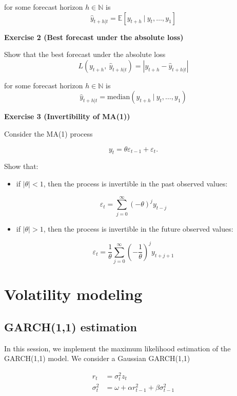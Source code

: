 \documentclass[
]{book}
\providecommand{\tightlist}{%
  \setlength{\itemsep}{0pt}\setlength{\parskip}{0pt}}
\begin{document}
for some forecast horizon \(h \in \mathbb{N}\) is
\[
\hat{y}_{t+h|t} = \mathbb{E} [y_{t+h} \ | \ y_t, \dots, y_1]
\]

\textbf{Exercise 2 (Best forecast under the absolute loss)}

Show that the best forecast under the absolute loss
\[
L(y_{t+h}, \ \hat{y}_{t+h|t}) = |y_{t+h}-\hat{y}_{t+h|t}|
\]

for some forecast horizon \(h \in \mathbb{N}\) is
\[
\hat{y}_{t+h|t} = \text{median}(y_{t+h}  \ | \ y_t, \dots, y_1)
\]

\textbf{Exercise 3 (Invertibility of MA(1))}

Consider the MA(1) process

\[
y_t = \theta \varepsilon_{t-1} + \varepsilon_t.
\]

Show that:

\begin{itemize}
\tightlist
\item
  if \(|\theta|<1\), then the process is invertible in the past observed values:
\end{itemize}

\[
 \varepsilon_t = \sum_{j=0}^{\infty} (-\theta)^j y_{t-j}
 \]

\begin{itemize}
\tightlist
\item
  if \(|\theta|>1\), then the process is invertible in the future observed values:
\end{itemize}

\[
 \varepsilon_t = \frac{1}{\theta} \sum_{j=0}^{\infty} \left(-\frac{1}{\theta}\right)^j y_{t+j+1}
 \]

\hypertarget{session06}{%
\chapter{Volatility modeling}\label{session06}}

\hypertarget{garch11-estimation}{%
\section{GARCH(1,1) estimation}\label{garch11-estimation}}

In this session, we implement the maximum likelihood estimation of the GARCH(1,1) model. We consider a Gaussian GARCH(1,1)

\[
\begin{aligned}
r_t &= \sigma^2_t z_t \\[1ex]
\sigma^2_t &= \omega + \alpha r_{t-1}^2 + \beta \sigma^2_{t-1}
\end{aligned}
\]
\end{document}

